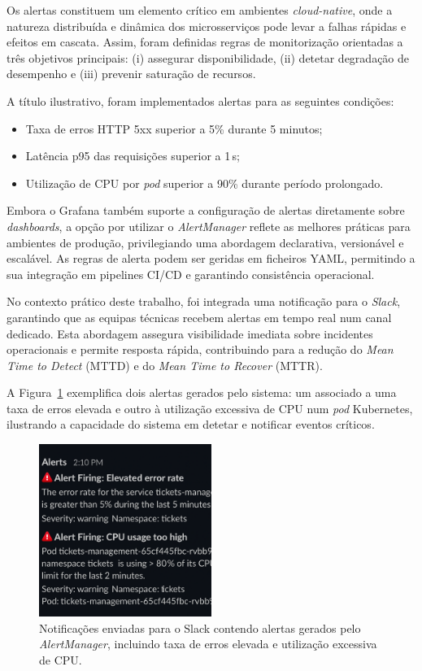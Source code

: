 Os alertas constituem um elemento crítico em ambientes \textit{cloud-native}, onde a natureza distribuída e dinâmica dos microsserviços pode levar a falhas rápidas e efeitos em cascata. Assim, foram definidas regras de monitorização orientadas a três objetivos principais: (i) assegurar disponibilidade, (ii) detetar degradação de desempenho e (iii) prevenir saturação de recursos.

A título ilustrativo, foram implementados alertas para as seguintes condições:
\begin{itemize}
    \item Taxa de erros HTTP 5xx superior a 5\% durante 5 minutos;
    \item Latência p95 das requisições superior a 1\,s;
    \item Utilização de CPU por \textit{pod} superior a 90\% durante período prolongado.
\end{itemize}

Embora o Grafana também suporte a configuração de alertas diretamente sobre \textit{dashboards}, a opção por utilizar o \textit{AlertManager} reflete as melhores práticas para ambientes de produção, privilegiando uma abordagem declarativa, versionável e escalável. As regras de alerta podem ser geridas em ficheiros YAML, permitindo a sua integração em pipelines CI/CD e garantindo consistência operacional.

No contexto prático deste trabalho, foi integrada uma notificação para o \textit{Slack}, garantindo que as equipas técnicas recebem alertas em tempo real num canal dedicado. Esta abordagem assegura visibilidade imediata sobre incidentes operacionais e permite resposta rápida, contribuindo para a redução do \textit{Mean Time to Detect} (MTTD) e do \textit{Mean Time to Recover} (MTTR).

A Figura~\ref{fig:slack-alerts} exemplifica dois alertas gerados pelo sistema: um associado a uma taxa de erros elevada e outro à utilização excessiva de CPU num \textit{pod} Kubernetes, ilustrando a capacidade do sistema em detetar e notificar eventos críticos.

\begin{figure}[H]
    \centering
    \includegraphics[width=0.5\textwidth]{images/Grafana/alertas.png}
    \caption{Notificações enviadas para o Slack contendo alertas gerados pelo \textit{AlertManager}, incluindo taxa de erros elevada e utilização excessiva de CPU.}
    \label{fig:slack-alerts}
\end{figure}


